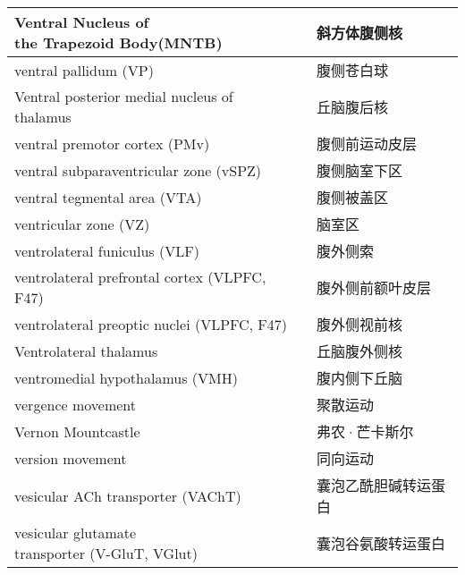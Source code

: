 \begin{longtable}{lll}
	\midrule
	\makecell{Ventral Nucleus of \\the Trapezoid Body(MNTB)}   && 斜方体腹侧核  \\
	
	\midrule
	ventral pallidum (VP)  && 腹侧苍白球  \\
	
	\midrule
	Ventral posterior medial nucleus of thalamus   && 丘脑腹后核  \\
	
	\midrule
	ventral premotor cortex (PMv)   && 腹侧前运动皮层  \\
	
	\midrule
	ventral subparaventricular zone (vSPZ)  && 腹侧脑室下区  \\
	
	\midrule
	ventral tegmental area (VTA)   && 腹侧被盖区  \\
	
	\midrule
	ventricular zone (VZ)   && 脑室区  \\
	
	\midrule
	ventrolateral funiculus (VLF)   && 腹外侧索  \\
	
	\midrule
	ventrolateral prefrontal cortex (VLPFC, F47)   && 腹外侧前额叶皮层  \\
	
	\midrule
	ventrolateral preoptic nuclei (VLPFC, F47)   && 腹外侧视前核  \\
	
	\midrule
	Ventrolateral thalamus   && 丘脑腹外侧核  \\
	
	\midrule
	ventromedial hypothalamus (VMH)  && 腹内侧下丘脑  \\
	
	\midrule
	vergence movement   && 聚散运动  \\
	
	\midrule
	Vernon Mountcastle   && 弗农·芒卡斯尔  \\
	
	\midrule
	version movement   && 同向运动  \\
	
	\midrule
	vesicular ACh transporter (VAChT)   && 囊泡乙酰胆碱转运蛋白  \\
	
	\midrule
	\makecell{vesicular glutamate \\transporter (V-GluT, VGlut)}   && 囊泡谷氨酸转运蛋白  \\
	

\end{longtable}
